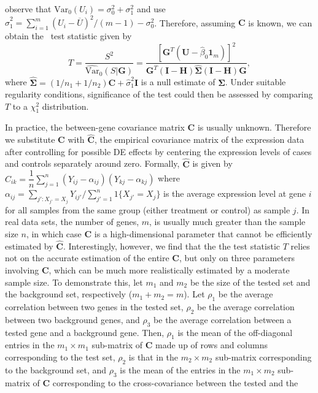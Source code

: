 	observe
	that $\mbox{Var}_{0}(U_i)=\sigma_0^2+\sigma_1^2$ and use
	$\hat\sigma_1^2=\sum_{i=1}^m(U_i-\overline{U})^2/(m-1)-\sigma_0^2$. Therefore, assuming $\bm C$ 
	is
	known, we can obtain the \OurMethod~test statistic given by
	\begin{equation}\label{eq:meqleastat}
	T = \dfrac{S^2}{\widehat{\mbox{Var}}_{0}(S|\bm G)} = \dfrac{[\bm G^T(\bm U-\hat\beta_0\bm
		1_m)]^2}{\bm G^T(\bm I-\bm H)\hat{\bm\Sigma}(\bm I-\bm H)\bm G}, 
	\end{equation}
	where $\hat{\bm\Sigma}=(1/n_1+1/n_2)\bm C+\hat\sigma_1^2\bm I$ is a null estimate of $\bm 
	\Sigma$. Under suitable regularity conditions, significance of the test could then be assessed 
	by comparing $T$ to a $\chi^2_1$ distribution.
	
	
	In practice, the between-gene covariance matrix $\bm C$ is usually unknown. Therefore we 
	substitute $\bm C$ with $\hat {\bm C}$, the empirical covariance matrix of the expression data 
	after controlling for
	possible DE effects by centering the expression levels of cases and controls separately around
	zero. Formally, $\hat {\bm C}$ is given by $\hat
	C_{ik}=\dfrac{1}{n}\sum_{j=1}^n(Y_{ij}-\alpha_{ij})(Y_{kj}-\alpha_{kj})$ where
	$\alpha_{ij}=\sum_{j':X_{j'}=X_{j}}Y_{ij'}/\sum_{j'=1}^n1\{X_{j'}=X_{j}\}$ is the average 
	expression level at gene $i$ for all samples from the same group (either treatment or control) 
	as sample $j$. In real data sets, the number of genes, $m$, is usually much greater than the 
	sample size $n$, in
	which case $\bm C$ is a high-dimensional parameter that cannot be efficiently estimated by $\hat
	{\bm C}$. Interestingly, however, we find that the the test statistic $T$ relies not on
	the accurate estimation of the entire $\bm C$, but only on three parameters involving $\bm C$, 
	which can be much more realistically estimated by a moderate sample size. To demonstrate this, 
	let $m_1$ and $m_2$ be the size of the tested set and the background set, respectively 
	($m_1+m_2=m$). Let $\rho_1$ be the average correlation between two genes in the tested set, 
	$\rho_2$ be the average correlation between two background genes, and $\rho_3$ be the average 
	correlation between a tested gene and a background gene. Then, $\rho_1$ is the mean of the 
	off-diagonal entries in the $m_1\times m_1$ sub-matrix of $\bm C$ made up of rows and columns 
	corresponding to the test set, $\rho_2$ is that in the $m_2\times m_2$ sub-matrix corresponding 
	to the background set, and $\rho_3$ is the mean of the entries in the $m_1\times m_2$ 
	sub-matrix of $\bm C$ corresponding to the cross-covariance between the tested and the 
